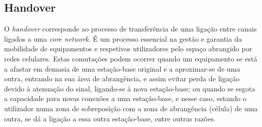 \documentclass{llncs}
\begin{document}
\subsection{Handover}

O \textit{handover} corresponde ao processo de transferência de uma ligação entre canais ligados a uma \textit{core network}. É um processo essencial na gestão e garantia da mobilidade de equipamentos e respetivos utilizadores pelo espaço abrangido por redes celulares. Estas comutações podem ocorrer quando um equipamento se está a afastar em demasia de uma estação-base original e a aproximar-se de uma outra, entrando na sua área de abrangência, e assim evitar perda de ligação devido à atenuação do sinal, ligando-se à nova estação-base; ou quando se esgota a capacidade para novas conexões a uma estação-base, e nesse caso, estando o utilizador numa zona de sobreposição com a zona de abrangência (célula) de uma outra, se dá a ligação a essa outra estação-base, entre outras razões.
\end{document}
